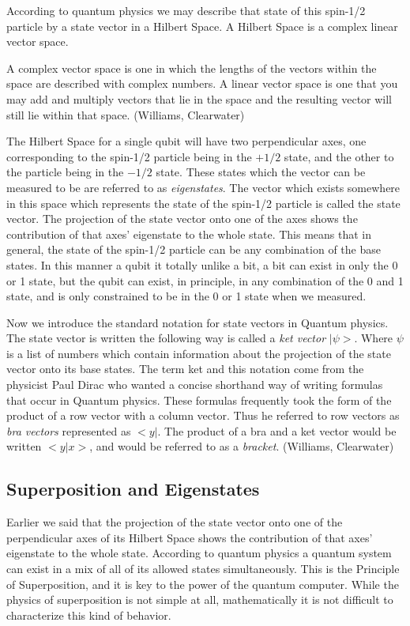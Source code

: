 \documentclass[]{article}
\begin{document}
According to quantum physics we may describe that state of this
spin-1/2 particle by a state vector in a Hilbert Space. A Hilbert
Space is a complex linear vector space.

A complex vector space is one in which the lengths of the vectors
within the space are described with complex numbers. A linear vector
space is one that you may add and multiply vectors that lie in the
space and the resulting vector will still lie within that
space. (Williams, Clearwater)

The Hilbert Space for a single qubit will have two perpendicular axes,
one corresponding to the spin-1/2 particle being in the $+1/2$ state,
and the other to the particle being in the $-1/2$ state. These states
which the vector can be measured to be are referred to as
\emph{eigenstates}.  The vector which exists somewhere in this space
which represents the state of the spin-1/2 particle is called the
state vector.  The projection of the state vector onto one of the axes
shows the contribution of that axes' eigenstate to the whole state.
This means that in general, the state of the spin-1/2 particle can be
any combination of the base states. In this manner a qubit it totally
unlike a bit, a bit can exist in only the 0 or 1 state, but the qubit
can exist, in principle, in any combination of the 0 and 1 state, and
is only constrained to be in the 0 or 1 state when we measured.

Now we introduce the standard notation for state vectors in Quantum
physics. The state vector is written the following way is called a
\emph{ket vector} $|\psi>$. Where $\psi$ is a list of numbers which
contain information about the projection of the state vector onto its
base states. The term ket and this notation come from the physicist
Paul Dirac who wanted a concise shorthand way of writing formulas that
occur in Quantum physics. These formulas frequently took the form of
the product of a row vector with a column vector.  Thus he referred to
row vectors as \emph{bra vectors} represented as $<y|$.  The product of a
bra and a ket vector would be written $<y|x>$, and would be
referred to as a \emph{bracket}.  (Williams, Clearwater)

\subsection{Superposition and Eigenstates}

Earlier we said that the projection of the state vector onto one of
the perpendicular axes of its Hilbert Space shows the contribution of
that axes' eigenstate to the whole state. According to quantum
physics a quantum system can exist in a mix of all of its allowed
states simultaneously. This is the Principle of Superposition, and it
is key to the power of the quantum computer.  While the physics of
superposition is not simple at all, mathematically it is not difficult
to characterize this kind of behavior.
\end{document}
